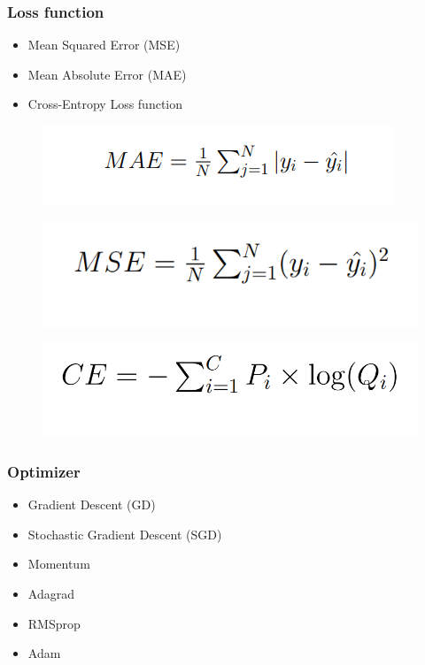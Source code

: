 \documentclass{beamer}
\begin{document}
\begin{frame}
\frametitle{Loss function}
\begin{itemize}
    \item Mean Squared Error (MSE)
    \item Mean Absolute Error (MAE)
    \item Cross-Entropy Loss function
\end{itemize}
\begin{figure}
    \centering
    \includegraphics[width=0.7\linewidth]{mae.png}
    
    
\end{figure}
\begin{figure}
    \centering
    \includegraphics[width=0.7\linewidth]{mse.png}
    
    
\end{figure}

\begin{figure}
    \centering
    \includegraphics[width=0.7\linewidth]{crosse.png}
    
    
\end{figure}
\end{frame}

\begin{frame}
\frametitle{Optimizer}
\begin{itemize}
    \item Gradient Descent (GD)
    \item Stochastic Gradient Descent (SGD)
    \item Momentum
    \item Adagrad
    \item RMSprop
    \item Adam
\end{itemize}
\end{frame}
\end{document}
